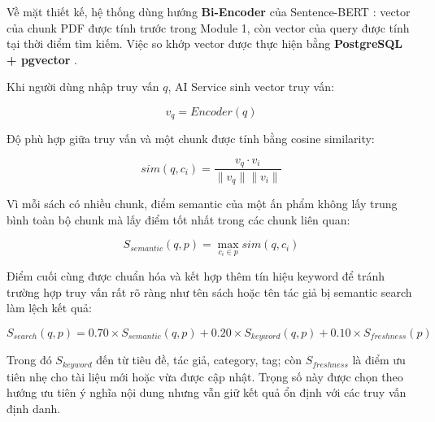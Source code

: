 Về mặt thiết kế, hệ thống dùng hướng \textbf{Bi-Encoder} của Sentence-BERT \cite{Reimers2019SentenceBERT}: vector của chunk PDF được tính trước trong Module 1, còn vector của query được tính tại thời điểm tìm kiếm. Việc so khớp vector được thực hiện bằng \textbf{PostgreSQL + pgvector} \cite{pgvector_docs}.

Khi người dùng nhập truy vấn $q$, AI Service sinh vector truy vấn:

\[
v_q = Encoder(q)
\]

Độ phù hợp giữa truy vấn và một chunk được tính bằng cosine similarity:

\[
sim(q,c_i) = \frac{v_q \cdot v_i}{\|v_q\| \|v_i\|}
\]

Vì mỗi sách có nhiều chunk, điểm semantic của một ấn phẩm không lấy trung bình
toàn bộ chunk mà lấy điểm tốt nhất trong các chunk liên quan:

\[
S_{semantic}(q,p) = \max_{c_i \in p} sim(q,c_i)
\]

Điểm cuối cùng được chuẩn hóa và kết hợp thêm tín hiệu keyword để tránh trường
hợp truy vấn rất rõ ràng như tên sách hoặc tên tác giả bị semantic search làm
lệch kết quả:

\[
S_{search}(q,p) =
0.70 \times S_{semantic}(q,p)
+ 0.20 \times S_{keyword}(q,p)
+ 0.10 \times S_{freshness}(p)
\]

Trong đó $S_{keyword}$ đến từ tiêu đề, tác giả, category, tag; còn
$S_{freshness}$ là điểm ưu tiên nhẹ cho tài liệu mới hoặc vừa được cập nhật.
Trọng số này được chọn theo hướng ưu tiên ý nghĩa nội dung nhưng vẫn giữ kết quả
ổn định với các truy vấn định danh.

